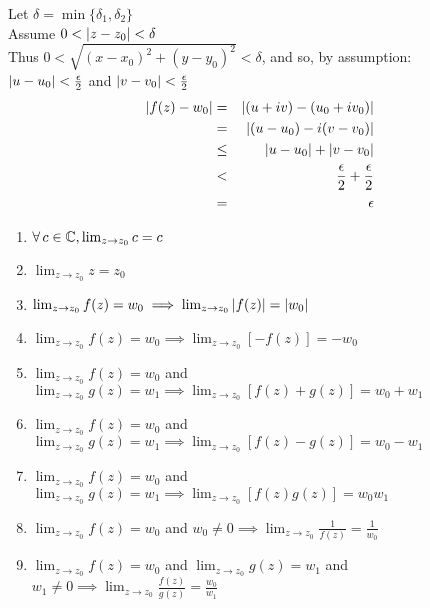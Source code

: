 \documentclass[letterpaper,12pt,fleqn]{article}
\renewcommand{\d}{\delta}
\newcommand{\e}{\epsilon}
\newcommand{\limz}{\lim_{z\to z_0}}
\begin{document}
\begin{theproof}
\begin{description}
    Let $\d=\min\{\d_1,\d_2\}$ \\
    Assume $0<\abs{z-z_0}<\d$ \\
    Thus $0<\sqrt{(x-x_0)^2+(y-y_0)^2}<\d$, and so, by assumption: \\
    $\abs{u-u_0}<\frac{\e}{2}$ and $\abs{v-v_0}<\frac{\e}{2}$ \\
    \begin{eqnarray*}
      \abs{f(z)-w_0} &=& \abs{(u+iv)-(u_0+iv_0)} \\
      &=& \abs{(u-u_0)-i(v-v_0)} \\
      &\le& \abs{u-u_0}+\abs{v-v_0} \\
      &<& \frac{\e}{2}+\frac{\e}{2} \\
      &=& \e \\
    \end{eqnarray*}
  \end{description}
\end{theproof}

\begin{theorem}
  \listbreak
  \begin{enumerate}
  \item $\forall\,c\in\C,\limz{c}=c$
  \item $\limz{z}=z_0$
  \item $\limz{f(z)}=w_0\implies\limz{\abs{f(z)}}=\abs{w_0}$
  \item $\limz{f(z)}=w_0\implies\limz{[-f(z)]}=-w_0$
  \item $\limz{f(z)}=w_0$ and $\limz{g(z)}=w_1\implies
    \limz{[f(z)+g(z)]}=w_0+w_1$
  \item $\limz{f(z)}=w_0$ and $\limz{g(z)}=w_1\implies
    \limz{[f(z)-g(z)]}=w_0-w_1$
  \item $\limz{f(z)}=w_0$ and $\limz{g(z)}=w_1\implies
    \limz{[f(z)g(z)]}=w_0w_1$
  \item $\limz{f(z)}=w_0$ and $w_0\ne0\implies
    \limz{\frac{1}{f(z)}}=\frac{1}{w_0}$
  \item $\limz{f(z)}=w_0$ and $\limz{g(z)}=w_1$ and $w_1\ne0\implies
    \limz{\frac{f(z)}{g(z)}}=\frac{w_0}{w_1}$
  \end{enumerate}
\end{theorem}
\end{document}
